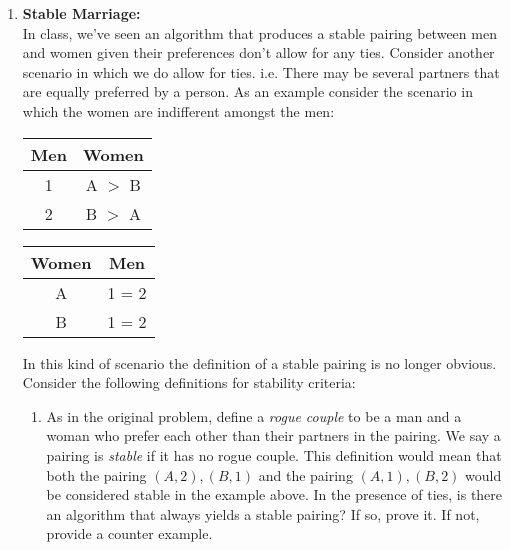 \documentclass[11pt,fleqn]{article}
\begin{document}
\begin{enumerate}
\newpage
\item {\bf Stable Marriage:}\\
In class, we've seen an algorithm that produces a stable pairing between men and women given their preferences don't allow for any ties.  Consider another scenario in which we do allow for ties.  i.e. There may be several partners that are equally preferred by a person.  As an example consider the scenario in which the women are indifferent amongst the men:
\begin{center}
\begin{minipage}{2in}
    \begin{tabular}{|c|c|}
      \hline
          \mbox{Men} & \mbox{Women} \\ \hline
      1 & A \hspace{0.2cm}$>$\hspace{0.2cm} B \\ \hline
      2 & B \hspace{0.2cm}$>$\hspace{0.2cm} A \\ \hline
    \end{tabular}
\end{minipage}
\begin{minipage}{2in}
    \begin{tabular}{|c|c|}
      \hline
          \mbox{Women} & \mbox{Men} \\ \hline
      A & 1 \hspace{0.2cm}=\hspace{0.2cm}  2  \\ \hline
      B & 1 \hspace{0.2cm}=\hspace{0.2cm}  2 \\ \hline
    \end{tabular}
\end{minipage}
\end{center}
In this kind of scenario the definition of a stable pairing is no longer obvious.  Consider the following definitions for stability criteria: 
\begin{enumerate}
\item As in the original problem, define a {\it rogue couple} to be a man and a woman who prefer each other than their partners in the pairing. We say a pairing is {\it stable} if it has no rogue couple.  This definition would mean that both the pairing $(A,2), (B,1)$ and the pairing $(A,1), (B,2)$ would be considered stable in the example above.  In the presence of ties, is there an algorithm that always yields a stable pairing?  If so, prove it.  If not, provide a counter example.


\end{enumerate}
\end{enumerate}
\end{document}
